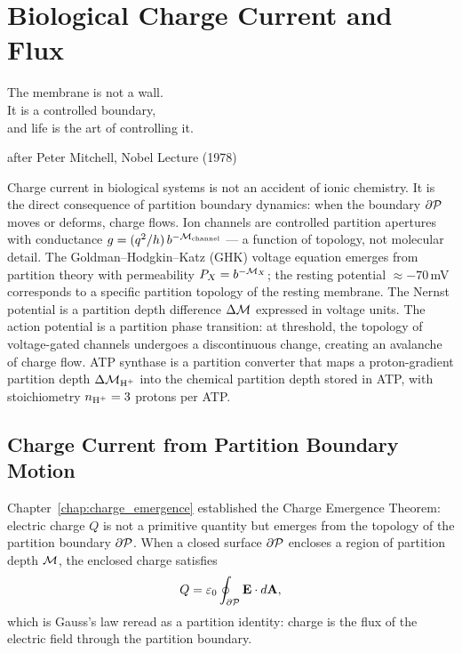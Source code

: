 
\chapter{Biological Charge Current and Flux}
\label{chap:charge_current}

\epigraph{%
  The membrane is not a wall.\\
  It is a controlled boundary,\\
  and life is the art of controlling it.%
}{after Peter Mitchell, Nobel Lecture (1978)}

\begin{chapterbox}
Charge current in biological systems is not an accident of ionic chemistry.
It is the direct consequence of partition boundary dynamics: when the boundary
$\partial\mathcal{P}$ moves or deforms, charge flows. Ion channels are controlled
partition apertures with conductance $g = (q^2/h)\,b^{-\mathcal{M}_{\mathrm{channel}}}$
--- a function of topology, not molecular detail. The Goldman--Hodgkin--Katz
(GHK) voltage equation emerges from partition theory with permeability
$P_X = b^{-\mathcal{M}_X}$; the resting potential $\approx -70$\,mV corresponds
to a specific partition topology of the resting membrane. The Nernst potential
is a partition depth difference $\Delta\mathcal{M}$ expressed in voltage units.
The action potential is a partition phase transition: at threshold,
the topology of voltage-gated  channels undergoes a discontinuous
change, creating an avalanche of charge flow. ATP synthase is a partition
converter that maps a proton-gradient partition depth $\Delta\Depth_{\ce{H+}}$
into the chemical partition depth stored in ATP, with stoichiometry
$n_{\ce{H+}} = 3$ protons per ATP.
\end{chapterbox}

\section{Charge Current from Partition Boundary Motion}
\label{sec:charge_from_boundary}

Chapter~\ref{chap:charge_emergence} established the Charge Emergence Theorem:
electric charge $Q$ is not a primitive quantity but emerges from the topology
of the partition boundary $\partial\mathcal{P}$. When a closed surface $\partial\mathcal{P}$
encloses a region of partition depth $\mathcal{M}$, the enclosed charge satisfies
\begin{equation}
  Q = \varepsilon_0 \oint_{\partial\mathcal{P}} \mathbf{E} \cdot d\mathbf{A},
  \label{eq:gauss_partition}
\end{equation}
which is Gauss's law reread as a partition identity: charge is the flux of
the electric field through the partition boundary.

